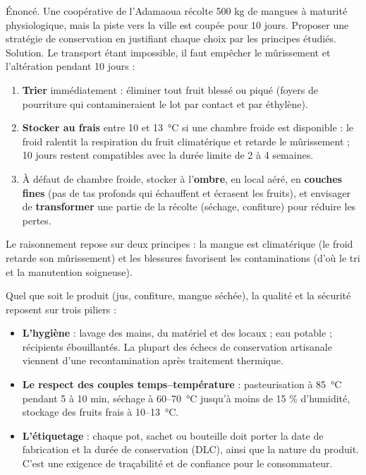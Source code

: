 \documentclass[11pt]{article}
\newcommand{\cle}[1]{{\popxbold\color{popdark}#1}}
\newcounter{popsec}
\newcounter{popsub}
\newcommand{\courssub}[1]{%
  \stepcounter{popsub}%
  \par\vspace{9pt}\noindent{\popxbold\fontsize{11.5}{13}\selectfont\color{popink}{\color{poporange}\thepopsec.\thepopsub}\hspace{6pt}#1}\par\nopagebreak\vspace{4pt}
}
\begin{document}
\begin{exoresolu}
Énoncé. Une coopérative de l'Adamaoua récolte 500 kg de mangues à maturité physiologique, mais la piste vers la ville est coupée pour 10 jours. Proposer une stratégie de conservation en justifiant chaque choix par les principes étudiés.
\tcblower
Solution. Le transport étant impossible, il faut empêcher le mûrissement et l'altération pendant 10 jours :
\begin{enumerate}
\item \textbf{Trier} immédiatement : éliminer tout fruit blessé ou piqué (foyers de pourriture qui contamineraient le lot par contact et par éthylène).
\item \textbf{Stocker au frais} entre 10 et \SI{13}{\celsius} si une chambre froide est disponible : le froid ralentit la respiration du fruit climatérique et retarde le mûrissement ; 10 jours restent compatibles avec la durée limite de 2 à 4 semaines.
\item À défaut de chambre froide, stocker à l'\textbf{ombre}, en local aéré, en \textbf{couches fines} (pas de tas profonds qui échauffent et écrasent les fruits), et envisager de \textbf{transformer} une partie de la récolte (séchage, confiture) pour réduire les pertes.
\end{enumerate}
Le raisonnement repose sur deux principes : la mangue est climatérique (le froid retarde son mûrissement) et les blessures favorisent les contaminations (d'où le tri et la manutention soigneuse).
\end{exoresolu}

\courssub{Contrôle qualité et enjeux}

Quel que soit le produit (jus, confiture, mangue séchée), la qualité et la sécurité reposent sur trois piliers :

\begin{itemize}
\item \textbf{L'hygiène} : lavage des mains, du matériel et des locaux ; eau potable ; récipients ébouillantés. La plupart des échecs de conservation artisanale viennent d'une recontamination après traitement thermique.
\item \textbf{Le respect des couples temps--température} : pasteurisation à \SI{85}{\celsius} pendant 5 à 10 min, séchage à 60--\SI{70}{\celsius} jusqu'à moins de 15 \% d'humidité, stockage des fruits frais à 10--\SI{13}{\celsius}.
\item \textbf{L'étiquetage} : chaque pot, sachet ou bouteille doit porter la \cle{date de fabrication} et la \cle{durée de conservation} (DLC), ainsi que la nature du produit. C'est une exigence de traçabilité et de confiance pour le consommateur.
\end{itemize}
\end{document}

